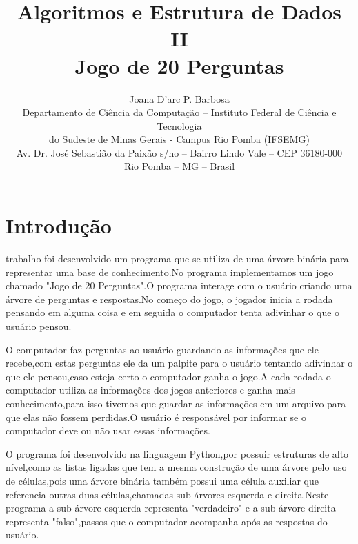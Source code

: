 \documentclass[12pt]{article}
\title{\Large Algoritmos e Estrutura de Dados II\\Jogo de 20 Perguntas}%
\author{Joana D’arc P. Barbosa\inst{1}
	\\Departamento de Ciência da Computação – Instituto Federal de Ciência e Tecnologia\\
	do Sudeste de Minas Gerais - Campus Rio Pomba (IFSEMG)
	\\
	Av. Dr. José Sebastião da Paixão s/no -- Bairro Lindo Vale -- CEP 36180-000\\
	Rio Pomba -- MG -- Brasil
}
\begin{document}
	


\section{Introdução}
	
trabalho foi desenvolvido um programa que se utiliza de uma árvore binária para representar uma base de conhecimento.No programa implementamos um jogo chamado "Jogo de 20 Perguntas".O programa interage com o usuário criando uma árvore de perguntas e respostas.No começo do jogo, o jogador inicia a rodada pensando em alguma coisa e em seguida o computador tenta adivinhar o que o usuário pensou. 
\par O computador faz perguntas ao usuário guardando as informações que ele recebe,com estas perguntas ele da um palpite para o usuário tentando adivinhar o que ele pensou,caso esteja certo o computador ganha o jogo.A cada rodada o computador utiliza as informações dos jogos anteriores e ganha mais conhecimento,para isso tivemos que guardar as informações em um arquivo para que elas não fossem perdidas.O usuário é responsável por informar se o computador deve ou não usar essas informações.
\par O programa foi desenvolvido na linguagem Python,por possuir estruturas de alto nível,como as listas ligadas que tem a mesma construção de uma árvore pelo uso de células,pois uma árvore binária também possui uma célula auxiliar que referencia outras duas células,chamadas sub-árvores esquerda e direita.Neste programa a sub-árvore esquerda representa "verdadeiro" e a sub-árvore direita representa "falso",passos que o computador acompanha após as respostas do usuário. 
\newpage
\end{document}
